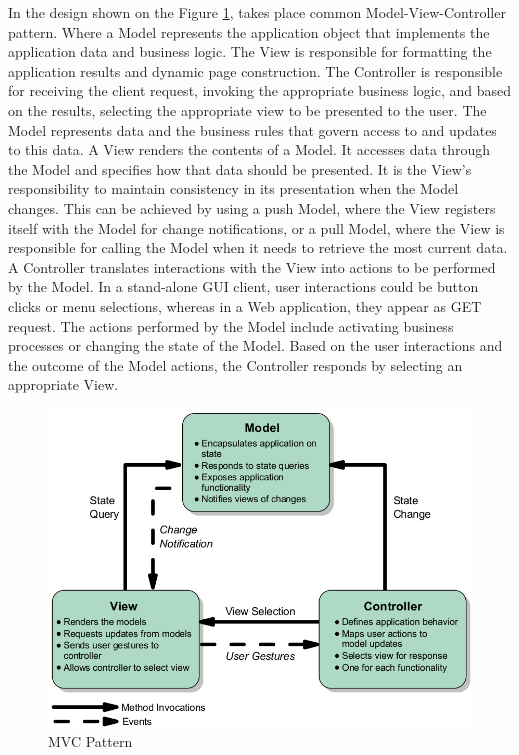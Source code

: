     In the design shown on the Figure \ref{img:MVCPattern}, takes place common Model-View-Controller pattern. Where a Model represents the application object that implements the application data and business logic. The View is responsible for formatting the application results and dynamic page construction. The Controller is responsible for receiving the client request, invoking the appropriate business logic, and based on the results, selecting the appropriate view to be presented to the user. The Model represents data and the business rules that govern access to and updates to this data. A View renders the contents of a Model. It accesses data through the Model and specifies how that data should be presented. It is the View's responsibility to maintain consistency in its presentation when the Model changes. This can be achieved by using a push Model, where the View registers itself with the Model for change notifications, or a pull Model, where the View is responsible for calling the Model when it needs to retrieve the most current data. A Controller translates interactions with the View into actions to be performed by the Model. In a stand-alone GUI client, user interactions could be button clicks or menu selections, whereas in a Web application, they appear as GET request. The actions performed by the Model include activating business processes or changing the state of the Model. Based on the user interactions and the outcome of the Model actions, the Controller responds by selecting an appropriate View.

     \begin{figure}[!ht]
     \centering
     \includegraphics[scale=0.5]{images/MVCPattern.png}   
     \caption[MVC Pattern]{MVC Pattern}
     \label{img:MVCPattern}                           
     \end{figure}
  
